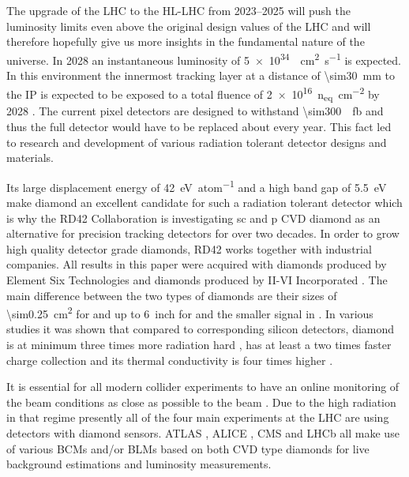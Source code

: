 The upgrade of the \ac{LHC} to the \ac{HL-LHC} from \SIrange{2023}{2025}{} \cite{hllhc} will push the luminosity limits even above the original design values of the \ac{LHC} and will therefore hopefully give us more insights in the fundamental nature of the universe. In 2028 an instantaneous luminosity of \SI{5e34}{\per\centi\meter\squared\per\second} is expected. In this environment the innermost tracking layer at a distance of \SI{\sim30}{\milli\meter} to the \ac{IP}
is expected to be exposed to a total fluence of \SI{2e16}{n_{eq}\per \centi\meter^2} by 2028 \cite{auzinger}. The current pixel detectors are designed to withstand \SI{\sim300}{\per\femto\barn} and thus the full detector would have to be replaced about every year. This fact led to research and development of various radiation tolerant detector designs and materials.\par
Its large displacement energy of \SI{42}{\electronvolt\per atom} and a high band gap of \SI{5.5}{\electronvolt} make diamond an excellent candidate for such a radiation tolerant detector which is why the RD42 Collaboration is investigating \ac{sc} and \ac{p} \ac{CVD} diamond as an alternative for precision tracking detectors for over two decades. In order to grow high quality detector grade diamonds, RD42 works together with industrial companies. All results in this paper were acquired with \sccvd diamonds produced by Element Six Technologies \cite{e6} and \pcvd diamonds produced by II-VI Incorporated \cite{II6}. The main difference between the two types of diamonds are their sizes of \SI{\sim0.25}{\centi\meter\squared} for \sccvd and up to \SI{6}{inch} for \pcvd and the smaller signal in \pcvd \cite{felix}.
In various studies it was shown that compared to corresponding silicon detectors, diamond is at minimum three times more radiation hard \cite{deboer}, has at least a two times faster charge collection \cite{pernegger} and its thermal conductivity is four times higher \cite{zhao}.\par
It is essential for all modern collider experiments to have an online monitoring of the beam conditions as close as possible to the beam \cite{hllhc}. Due to the high radiation in that regime presently all of the four main experiments at the \ac{LHC} are using detectors with diamond sensors. ATLAS \cite{gorisek}, ALICE \cite{hempel}, CMS \cite{bartz} and LHCb \cite{domke} all make use of various \acp{BCM} and/or \acp{BLM} based on both \ac{CVD} type diamonds for live background estimations and luminosity measurements.\par
